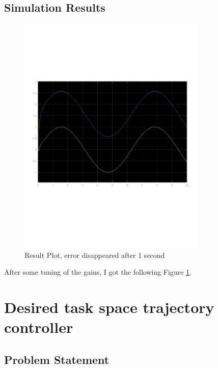 \documentclass{article}
\begin{document}
\subsection{Simulation Results}

\begin{figure}[ht]
    \centering
    \includegraphics[width=0.8\textwidth]{figures/result_computed.pdf}
    \caption{Result Plot, error disappeared after 1 second}
    \label{fig:result_computed_plot}
\end{figure}

After some tuning of the gains, I got the following Figure \ref{fig:result_computed_plot}. \\





\newpage

\section{\centering \Large Desired task space trajectory controller} 

\subsection*{Problem Statement}
\end{document}
